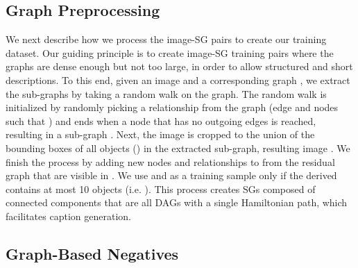\documentclass[11pt]{article}
\begin{document}
\subsection{Graph Preprocessing}
\label{supp:models:graph}

We next describe how we process the image-SG pairs to create our training dataset. Our guiding principle is to create image-SG training pairs where the graphs are dense enough but not too large, in order to allow structured and short descriptions. To this end, given an image  and a corresponding graph , we extract the sub-graphs by taking a random walk on the graph. The random walk is initialized by randomly picking a relationship from the graph (edge  and nodes  such that ) and ends when a node that has no outgoing edges is reached, resulting in a sub-graph . Next, the image is cropped to the union of the bounding boxes of all objects () in the extracted sub-graph, resulting image . We finish the process by adding new nodes and relationships to  from the residual graph  that are visible in . We use  and  as a training sample only if the derived  contains at most 10 objects (i.e. ). This process creates SGs composed of connected components that are all DAGs with a single Hamiltonian path, which facilitates caption generation.

\subsection{Graph-Based Negatives} 
\label{supp:models:negatives}
\end{document}
